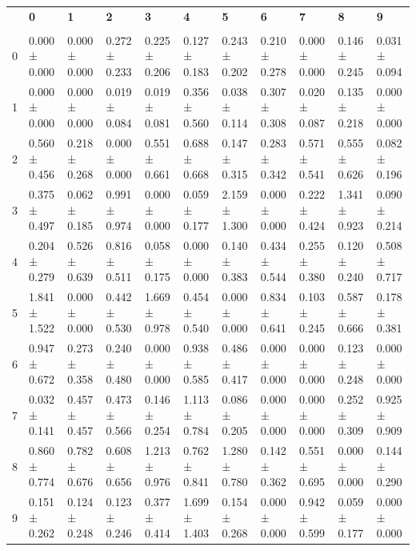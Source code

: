 \begingroup
\scriptsize
\setlength{\tabcolsep}{3pt}
\begin{tabular}{lllllllllll}
\toprule
 & \textbf{0} & \textbf{1} & \textbf{2} & \textbf{3} & \textbf{4} & \textbf{5} & \textbf{6} & \textbf{7} & \textbf{8} & \textbf{9} \\
  &  &  &  &  &  &  &  &  &  &  \\
\midrule
0 & 0.000 ± 0.000 & 0.000 ± 0.000 & 0.272 ± 0.233 & 0.225 ± 0.206 & 0.127 ± 0.183 & 0.243 ± 0.202 & 0.210 ± 0.278 & 0.000 ± 0.000 & 0.146 ± 0.245 & 0.031 ± 0.094 \\
1 & 0.000 ± 0.000 & 0.000 ± 0.000 & 0.019 ± 0.084 & 0.019 ± 0.081 & 0.356 ± 0.560 & 0.038 ± 0.114 & 0.307 ± 0.308 & 0.020 ± 0.087 & 0.135 ± 0.218 & 0.000 ± 0.000 \\
2 & 0.560 ± 0.456 & 0.218 ± 0.268 & 0.000 ± 0.000 & 0.551 ± 0.661 & 0.688 ± 0.668 & 0.147 ± 0.315 & 0.283 ± 0.342 & 0.571 ± 0.541 & 0.555 ± 0.626 & 0.082 ± 0.196 \\
3 & 0.375 ± 0.497 & 0.062 ± 0.185 & 0.991 ± 0.974 & 0.000 ± 0.000 & 0.059 ± 0.177 & 2.159 ± 1.300 & 0.000 ± 0.000 & 0.222 ± 0.424 & 1.341 ± 0.923 & 0.090 ± 0.214 \\
4 & 0.204 ± 0.279 & 0.526 ± 0.639 & 0.816 ± 0.511 & 0.058 ± 0.175 & 0.000 ± 0.000 & 0.140 ± 0.383 & 0.434 ± 0.544 & 0.255 ± 0.380 & 0.120 ± 0.240 & 0.508 ± 0.717 \\
5 & 1.841 ± 1.522 & 0.000 ± 0.000 & 0.442 ± 0.530 & 1.669 ± 0.978 & 0.454 ± 0.540 & 0.000 ± 0.000 & 0.834 ± 0.641 & 0.103 ± 0.245 & 0.587 ± 0.666 & 0.178 ± 0.381 \\
6 & 0.947 ± 0.672 & 0.273 ± 0.358 & 0.240 ± 0.480 & 0.000 ± 0.000 & 0.938 ± 0.585 & 0.486 ± 0.417 & 0.000 ± 0.000 & 0.000 ± 0.000 & 0.123 ± 0.248 & 0.000 ± 0.000 \\
7 & 0.032 ± 0.141 & 0.457 ± 0.457 & 0.473 ± 0.566 & 0.146 ± 0.254 & 1.113 ± 0.784 & 0.086 ± 0.205 & 0.000 ± 0.000 & 0.000 ± 0.000 & 0.252 ± 0.309 & 0.925 ± 0.909 \\
8 & 0.860 ± 0.774 & 0.782 ± 0.676 & 0.608 ± 0.656 & 1.213 ± 0.976 & 0.762 ± 0.841 & 1.280 ± 0.780 & 0.142 ± 0.362 & 0.551 ± 0.695 & 0.000 ± 0.000 & 0.144 ± 0.290 \\
9 & 0.151 ± 0.262 & 0.124 ± 0.248 & 0.123 ± 0.246 & 0.377 ± 0.414 & 1.699 ± 1.403 & 0.154 ± 0.268 & 0.000 ± 0.000 & 0.942 ± 0.599 & 0.059 ± 0.177 & 0.000 ± 0.000 \\
\bottomrule
\end{tabular}

\endgroup
